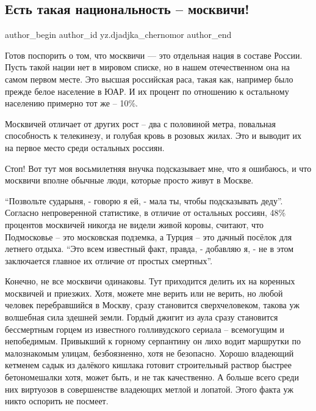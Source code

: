  
 
 
 
 
 
\subsection{Есть такая национальность – москвичи!}
\label{sec:26_01_2022.yz.djadjka_chernomor.1.nacionalnost_moskvichi}
 
\ifcmt
 author_begin
   author_id yz.djadjka_chernomor
 author_end
\fi

Готов поспорить о том, что москвичи — это отдельная нация в составе России.
Пусть такой нации нет в мировом списке, но в нашем отечественном она на самом
первом месте. Это высшая российская раса, такая как, например было прежде белое
население в ЮАР. И их процент по отношению к остальному населению примерно тот
же – 10\%.

Москвичей отличает от других рост – два с половиной метра, повальная
способность к телекинезу, и голубая кровь в розовых жилах. Это и выводит их на
первое место среди остальных россиян.


Стоп! Вот тут моя восьмилетняя внучка подсказывает мне, что я ошибаюсь, и что
москвичи вполне обычные люди, которые просто живут в Москве.

\enquote{Позвольте сударыня, - говорю я ей, - мала ты, чтобы подсказывать деду}.
Согласно непроверенной статистике, в отличие от остальных россиян, 48\%
процентов москвичей никогда не видели живой коровы, считают, что Подмосковье –
это московская подземка, а Турция – это дачный посёлок для летнего отдыха. \enquote{Это
всем известный факт, правда, - добавляю я, - не в этом заключается главное их
отличие от простых смертных}.

Конечно, не все москвичи одинаковы. Тут приходится делить их на коренных
москвичей и приезжих. Хотя, можете мне верить или не верить, но любой человек
перебравшийся в Москву, сразу становится сверхчеловеком, такова уж волшебная
сила здешней земли. Гордый джигит из аула сразу становится бессмертным горцем
из известного голливудского сериала – всемогущим и непобедимым. Привыкший к
горному серпантину он лихо водит маршрутки по малознакомым улицам,
безбоязненно, хотя не безопасно. Хорошо владеющий кетменем садык из далёкого
кишлака готовит строительный раствор быстрее бетономешалки хотя, может быть, и
не так качественно. А больше всего среди них виртуозов в совершенстве владеющих
метлой и лопатой. Этого факта уж никто оспорить не посмеет.

